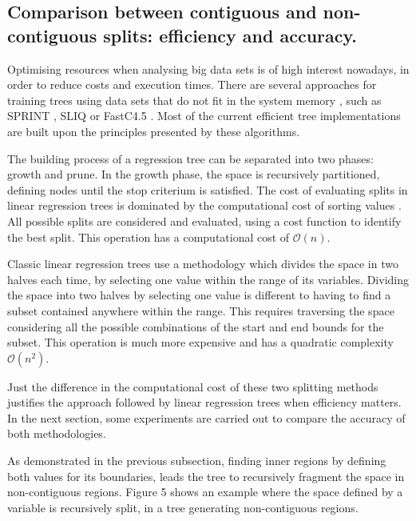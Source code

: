 \documentclass[times,twocolumn,final,authoryear]{elsarticle}
\begin{document}
\subsection{Comparison between contiguous and non-contiguous splits: efficiency and accuracy.} 

Optimising resources when analysing big data sets is of high interest nowadays, in order to reduce costs and execution times. There are several approaches for training trees using data sets that do not fit in the system memory \citep{Rokach2016}, such as SPRINT \citep{Shareretal1996}, SLIQ \citep{Mehtaetal1996} or FastC4.5 \citep{Heetal2007}. Most of the current efficient tree implementations are built upon the principles presented by these algorithms.

The building process of a regression tree can be separated into two phases: growth and prune. In the growth phase, the space is recursively partitioned, defining nodes until the stop criterium is satisfied. The cost of evaluating splits in linear regression trees is dominated by the computational cost of sorting values \citep{Shareretal1996}. All possible splits are considered and evaluated, using a cost function to identify the best split. This operation has a computational cost of $\mathcal{O}(n)$.

Classic linear regression trees use a methodology which divides the space in two halves each time, by selecting one value within the range of its variables. Dividing the space into two halves by selecting one value is different to having to find a subset contained anywhere within the range. This requires traversing the space considering all the possible combinations of the start and end bounds for the subset. This operation is much more expensive and has a quadratic complexity $\mathcal{O}(n^2)$.

Just the difference in the computational cost of these two splitting methods justifies the approach followed by linear regression trees when efficiency matters. In the next section, some experiments are carried out to compare the accuracy of both methodologies.

As demonstrated in the previous subsection, finding inner regions by defining both values for its boundaries, leads the tree to recursively fragment the space in non-contiguous regions. Figure 5 shows an example where the space defined by a variable is recursively split, in a tree generating non-contiguous regions.

%
%
\end{document}
